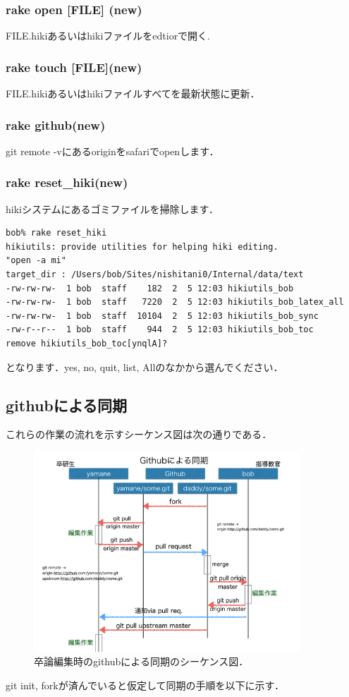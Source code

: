 \subsubsection{rake open [FILE] (new)}
FILE.hikiあるいはhikiファイルをedtiorで開く.

\subsubsection{rake touch [FILE](new)}
FILE.hikiあるいはhikiファイルすべてを最新状態に更新．

\subsubsection{rake github(new)}
git remote -vにあるoriginをsafariでopenします．

\subsubsection{rake reset\_hiki(new)}
hikiシステムにあるゴミファイルを掃除します．
\begin{lstlisting}[style=customCsh,basicstyle={\scriptsize\ttfamily}]
bob% rake reset_hiki
hikiutils: provide utilities for helping hiki editing.
"open -a mi"
target_dir : /Users/bob/Sites/nishitani0/Internal/data/text
-rw-rw-rw-  1 bob  staff    182  2  5 12:03 hikiutils_bob
-rw-rw-rw-  1 bob  staff   7220  2  5 12:03 hikiutils_bob_latex_all
-rw-rw-rw-  1 bob  staff  10104  2  5 12:03 hikiutils_bob_sync
-rw-r--r--  1 bob  staff    944  2  5 12:03 hikiutils_bob_toc
remove hikiutils_bob_toc[ynqlA]?
\end{lstlisting}
となります．yes, no, quit, list, Allのなかから選んでください．

\subsection{githubによる同期}
これらの作業の流れを示すシーケンス図は次の通りである．

\begin{figure}[htbp]\begin{center}
\includegraphics[width=10cm,bb= 0 0 737 553]{../figs/./hikiutils_bob.005.jpeg}
\caption{卒論編集時のgithubによる同期のシーケンス図．}
\label{default}\end{center}\end{figure}
git init, forkが済んでいると仮定して同期の手順を以下に示す．

